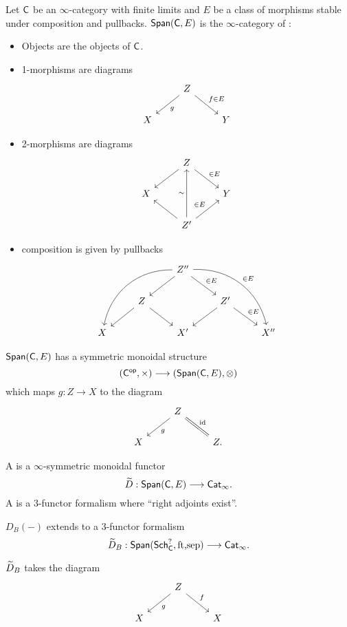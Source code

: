\begin{definition}[Fake]
Let $\mathsf{C}$ be an $\infty$-category with finite limits and $E$ be a class of morphisms
stable under composition and pullbacks. $\mathsf{Span}(\mathsf{C},E)$ is the $\infty$-category of :
\begin{itemize}
\item Objects are the objects of $\mathsf{C}$.
\item 1-morphisms are diagrams
\[
\begin{tikzcd}
& Z \ar[dl,"g"] \ar[dr,"f\in E"] \\
X & & Y
\end{tikzcd}
\]
\item 2-morphisms are diagrams
\[
\begin{tikzcd}
& Z \ar[dl] \ar[dr,"\in E"] \\
X & & Y \\
& Z' \ar[lu] \ar[uu,"\sim"] \ar[ur,"\in E"]
\end{tikzcd}
\]
\item composition is given by pullbacks
\[
\begin{tikzcd}
& & Z'' \ar[ddll, bend right=40] \ar[dl] \ar[dr,"\in E"] \ar[ddrr,bend left=40,"\in E"] \\
& Z \ar[dl] \ar[dr] & & Z' \ar[dl] \ar[dr,"\in E"] \\
X & & X' & & X''
\end{tikzcd}
\]
\end{itemize}
\end{definition}
$\mathsf{Span}(\mathsf{C},E)$ has a symmetric monoidal structure
\[
(\C\op,\times )\to (\cat{Span}(\C,E),\otimes)
\]
which maps $g:Z\to X$ to the diagram
\[
\begin{tikzcd}
& Z \ar[dl,"g"] \ar[dr,equals,"\id"] \\
X & & Z.
\end{tikzcd}
\]
\begin{definition}[Mann]
A  is a $\infty$-symmetric monoidal functor
\[
\wt{D}:\cat{Span}(\C,E) \to \cat{Cat}_\infty.
\]
A  is a 3-functor formalism where ``right adjoints exist''.
\end{definition}
\begin{fact}
$D_B(-)$ extends to a 3-functor formalism
\[
\wt{D}_B:\cat{Span}(\cat{Sch}_\C^{?},\text{ft,sep})\to \cat{Cat}_\infty.
\]
\end{fact}
$\widetilde{D}_B$ takes the diagram
\[
\begin{tikzcd}
& Z \ar[dl,"g"] \ar[dr,"f"] \\
X & & X
\end{tikzcd}
\]
